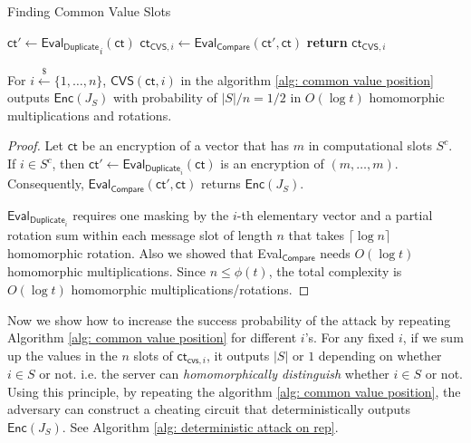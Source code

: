 \documentclass[runningheads]{llncs}
\newcommand{\ct}{\textsf{ct}{}}
\newcommand{\eval}{\textsf{Eval}}
\newcommand{\enc}{\textsf{Enc}}
\begin{document}
        \begin{algorithm}
            \caption{Finding Common Value Slots}
            \label{alg: common value position}
            \begin{algorithmic}[1]
                \Procedure{$\mathsf{CVS}$}{$\ct,i$}
                    \State $\ct'\gets\mathsf{\eval_{Duplicate}}_i(\ct)$ \Comment{$\ct'=\enc((x_i,\dots,x_i))$}
                    \State $\ct_{\textsf{CVS},i}\gets\eval_\mathsf{Compare}(\ct',\ct)$
                    \State \textbf{return} $\ct_{\mathsf{CVS},i}$
                \EndProcedure
            \end{algorithmic}
        \end{algorithm}
        \begin{lemma}
            For $i\overset{\$}{\gets}\{1,\dots,n\}$, {$\mathsf{CVS}(\mathsf{\ct},i)$} in the algorithm \ref{alg: common value position} outputs $\mathsf{Enc}(J_S)$ with probability of $|S|/n=1/2$ in $O(\log t)$ homomorphic multiplications and rotations.
        \end{lemma}
        \begin{proof}  
            Let $\ct$ be an encryption of a vector that has $m$ in computational slots $S^c$.
            If $i\in S^c$, then $\ct'\gets\eval_{\mathsf {Duplicate}_i}(\ct)$ is an encryption of $(m,\dots,m)$. Consequently, $\mathsf{Eval_{Compare}}(\ct',\ct)$ returns $\enc(J_S)$.
 
            $\eval_{\textsf{Duplicate}_i}$ requires one masking by the $i$-th elementary vector and a partial rotation sum within each message slot of length $n$ that takes $\lceil \log n \rceil$ homomorphic rotation. 
            Also we showed that \eval$_{\textsf{Compare}}$ needs $O(\log t)$ homomorphic multiplications. 
            Since $n\le \phi(t)$, the total complexity is $O(\log t)$ homomorphic multiplications/rotations.
        \end{proof}
        
    Now we show how to increase the success probability of the attack by repeating Algorithm \ref{alg: common value position} for different $i$'s.
    For any fixed $i$, if we sum up the values in the $n$ slots of $\ct_{\textsf{cvs},i}$, it outputs $|S|$ or $1$ depending on whether $i\in S$ or not. i.e. the server can {\em homomorphically distinguish} whether $i\in S$ or not.
    Using this principle, by repeating the algorithm \ref{alg: common value position}, the adversary can construct a cheating circuit that deterministically outputs $\enc(J_S)$. See Algorithm \ref{alg: deterministic attack on rep}.
    
\end{document}
